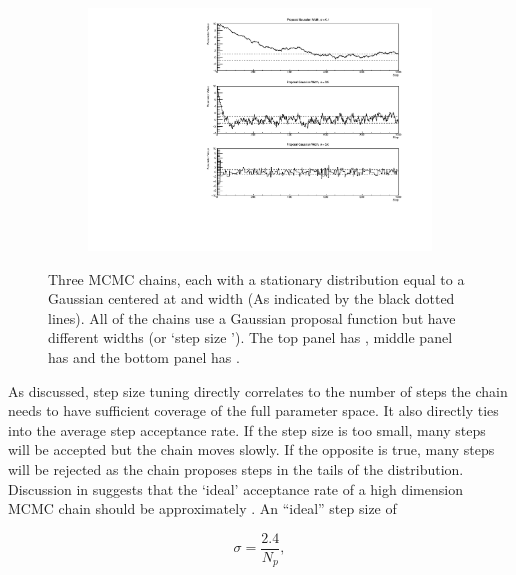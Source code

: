 \begin{figure}[h]
  \begin{subfigure}[t]{\textwidth}
    \includegraphics[width=\textwidth, trim={10mm 0mm 18mm 0mm}, clip,page=1]{Figures/MCMC/MCMCTechnique_StepSizes.pdf}
  \end{subfigure}
  \caption{Three MCMC chains, each with a stationary distribution equal to a Gaussian centered at  and width  (As indicated by the black dotted lines). All of the chains use a Gaussian proposal function but have different widths (or `step size \quickmath{\sigma}'). The top panel has , middle panel has  and the bottom panel has .}
  \label{fig:MCMC_MCTechniqueStepSizeStudy}
\end{figure}

As discussed, step size tuning directly correlates to the number of steps the chain needs to have sufficient coverage of the full parameter space. It also directly ties into the average step acceptance rate. If the step size is too small, many steps will be accepted but the chain moves slowly. If the opposite is true, many steps will be rejected as the chain proposes steps in the tails of the distribution. Discussion in \cite{Dunkley2005-xz} suggests that the `ideal' acceptance rate of a high dimension MCMC chain should be approximately . An ``ideal'' step size of

\begin{equation}
  \label{eq:MCMC_IdealStepSize}
  \sigma = \frac{2.4}{N_{p}},
\end{equation}

